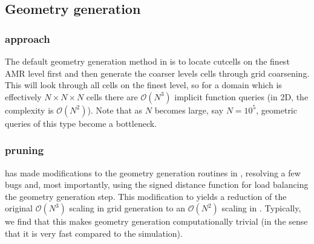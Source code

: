 \documentclass[letterpaper,10pt,english]{sphinxmanual}
\begin{document}
\subsection{Geometry generation}
\label{\detokenize{Source/SpatialDiscretization:geometry-generation}}\label{\detokenize{Source/SpatialDiscretization:chap-geometrygeneration}}

\subsubsection{ approach}
\label{\detokenize{Source/SpatialDiscretization:chombo-approach}}
\sphinxAtStartPar
The default geometry generation method in  is to locate cut\sphinxhyphen{}cells on the finest AMR level first and then generate the coarser levels cells through grid coarsening.
This will look through all cells on the finest level, so for a domain which is effectively \(N\times N\times N\) cells there are \(\mathcal{O}\left(N^3\right)\) implicit function queries (in 2D, the complexity is \(\mathcal{O}\left(N^2\right)\)).
Note that as \(N\) becomes large, say \(N=10^5\), geometric queries of this type become a bottleneck.


\subsubsection{ pruning}
\label{\detokenize{Source/SpatialDiscretization:chombo-discharge-pruning}}
\sphinxAtStartPar
{} has made modifications to the geometry generation routines in , resolving a few bugs and, most importantly, using the signed distance function for load balancing the geometry generation step.
This modification to  yields a reduction of the original \(\mathcal{O}\left(N^3\right)\) scaling in  grid generation to an \(\mathcal{O}\left(N^2\right)\) scaling in .
Typically, we find that this makes geometry generation computationally trivial (in the sense that it is very fast compared to the simulation).
\end{document}
